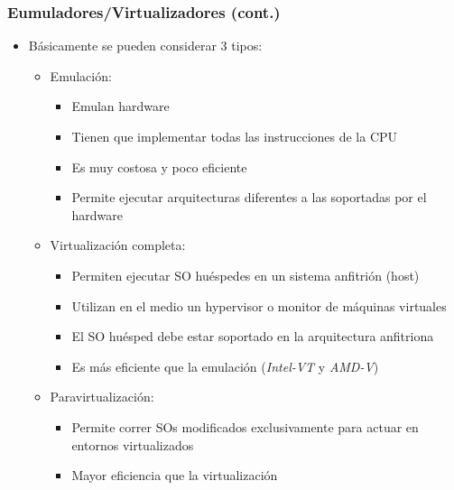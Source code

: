 \begin{frame}
	\frametitle{Eumuladores/Virtualizadores (cont.)}
	\begin{itemize}
		\item Básicamente se pueden considerar 3 tipos:	
		\begin{itemize}
			\item Emulación:
			\begin{itemize}
				\item Emulan hardware
				\item Tienen que implementar todas las instrucciones de la CPU
				\item Es muy costosa y poco eficiente
				\item Permite ejecutar arquitecturas diferentes a las soportadas por el hardware
			\end{itemize}
			\item Virtualización completa:
			\begin{itemize}
				\item Permiten ejecutar SO huéspedes en un sistema anfitrión (host)
				\item Utilizan en el medio un hypervisor o monitor de máquinas virtuales
				\item El SO huésped debe estar soportado en la arquitectura anfitriona
				\item Es más eficiente que la emulación (\emph{Intel-VT} y \emph{AMD-V})
			\end{itemize}
			\item Paravirtualización:
			\begin{itemize}
				\item Permite correr SOs modificados exclusivamente para actuar en entornos virtualizados
				\item Mayor eficiencia que la virtualización
			\end{itemize}			
		\end{itemize}		
	\end{itemize}
\end{frame}

